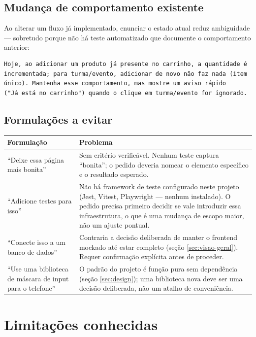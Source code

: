 \subsection{Mudança de comportamento existente}

Ao alterar um fluxo já implementado, enunciar o estado atual reduz ambiguidade
--- sobretudo porque não há teste automatizado que documente o comportamento
anterior:

\begin{lstlisting}[style=plain]
Hoje, ao adicionar um produto já presente no carrinho, a quantidade é
incrementada; para turma/evento, adicionar de novo não faz nada (item
único). Mantenha esse comportamento, mas mostre um aviso rápido
("Já está no carrinho") quando o clique em turma/evento for ignorado.
\end{lstlisting}

\subsection{Formulações a evitar}

\begin{longtable}{@{}p{6.6cm}p{7.9cm}@{}}
\toprule
\textbf{Formulação} & \textbf{Problema} \\
\midrule
\endhead
``Deixe essa página mais bonita'' &
Sem critério verificável. Nenhum teste captura ``bonita''; o pedido deveria
nomear o elemento específico e o resultado esperado. \\
\addlinespace
``Adicione testes para isso'' &
Não há framework de teste configurado neste projeto (Jest, Vitest, Playwright
--- nenhum instalado). O pedido precisa primeiro decidir se vale introduzir
essa infraestrutura, o que é uma mudança de escopo maior, não um ajuste
pontual. \\
\addlinespace
``Conecte isso a um banco de dados'' &
Contraria a decisão deliberada de manter o frontend mockado até estar
completo (seção \ref{sec:visao-geral}). Requer confirmação explícita antes de
proceder. \\
\addlinespace
``Use uma biblioteca de máscara de input para o telefone'' &
O padrão do projeto é função pura sem dependência (seção
\ref{sec:design}); uma biblioteca nova deve ser uma decisão deliberada, não
um atalho de conveniência. \\
\bottomrule
\end{longtable}

\section{Limitações conhecidas}
\label{sec:limitacoes}

